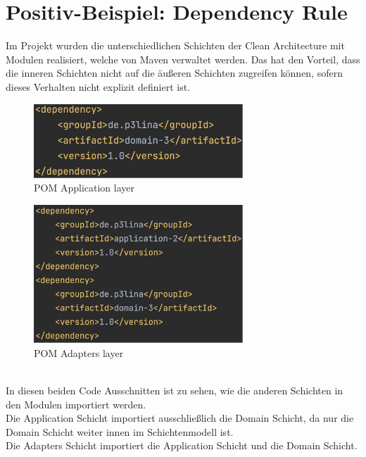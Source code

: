 \section{Positiv-Beispiel: Dependency Rule}
Im Projekt wurden die unterschiedlichen Schichten der Clean Architecture mit Modulen realisiert, welche von Maven verwaltet werden. Das hat den Vorteil, dass die inneren Schichten nicht auf die äußeren Schichten zugreifen können, sofern dieses Verhalten nicht explizit definiert ist.
\begin{figure}[ht]
    \includegraphics[width=0.7\textwidth]{Bilder/pom_application.png}
    \caption{POM Application layer}
    \label{fig:pom-application}
\end{figure}
\begin{figure}[ht]
    \includegraphics[width=0.7\textwidth]{Bilder/pom_adapters.png}
    \caption{POM Adapters layer}
    \label{fig:pom-adapters}
\end{figure}\\
In diesen beiden Code Ausschnitten ist zu sehen, wie die anderen Schichten in den Modulen importiert werden. \\Die Application Schicht importiert ausschließlich die Domain Schicht, da nur die Domain Schicht weiter innen im Schichtenmodell ist.\\
Die Adapters Schicht importiert die Application Schicht und die Domain Schicht.\newpage
